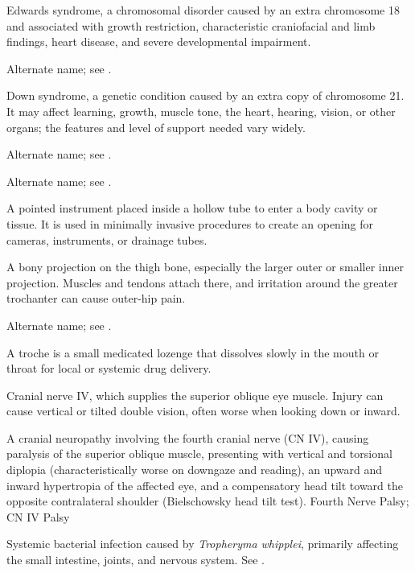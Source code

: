  Edwards syndrome, a chromosomal disorder caused by an extra chromosome 18 and associated with growth restriction, characteristic craniofacial and limb findings, heart disease, and severe developmental impairment.

 Alternate name; see .

 Down syndrome, a genetic condition caused by an extra copy of chromosome 21. It may affect learning, growth, muscle tone, the heart, hearing, vision, or other organs; the features and level of support needed vary widely.

 Alternate name; see .

 Alternate name; see .

 A pointed instrument placed inside a hollow tube to enter a body cavity or tissue. It is used in minimally invasive procedures to create an opening for cameras, instruments, or drainage tubes.

 A bony projection on the thigh bone, especially the larger outer or smaller inner projection. Muscles and tendons attach there, and irritation around the greater trochanter can cause outer-hip pain.

 Alternate name; see .

 A troche is a small medicated lozenge that dissolves slowly in the mouth or throat for local or systemic drug delivery.

 Cranial nerve IV, which supplies the superior oblique eye muscle. Injury can cause vertical or tilted double vision, often worse when looking down or inward.

 A cranial neuropathy involving the fourth cranial nerve (CN IV), causing paralysis of the superior oblique muscle, presenting with vertical and torsional diplopia (characteristically worse on downgaze and reading), an upward and inward hypertropia of the affected eye, and a compensatory head tilt toward the opposite contralateral shoulder (Bielschowsky head tilt test).
\synonyms
Fourth Nerve Palsy; CN IV Palsy

 Systemic bacterial infection caused by \textit{Tropheryma whipplei}, primarily affecting the small intestine, joints, and nervous system. See .

